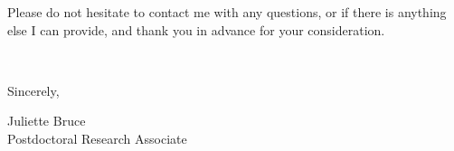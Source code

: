 \documentclass[11pt]{article}
\begin{document}
Please do not hesitate to contact me with any questions, or if there is anything else I can provide, and thank you in advance for your consideration. 

\vspace{24pt}
\noindent
\begin{minipage}{0.99\textwidth}
\begin{minipage}{0.69\textwidth}
\textcolor{white}{.}
\end{minipage}
\begin{minipage}{0.29\textwidth}
Sincerely, 

\vspace{36pt}
Juliette Bruce\\
Postdoctoral Research Associate\end{minipage}
\end{minipage}

\end{document}

